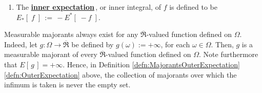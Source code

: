 \begin{definition}
\begin{enumerate}
\begin{equation*}
\begin{array}{c}
				\textnormal{$g:\Omega\rightarrow\overline{\Re}$ is a measurable majorant of $f$, and}
				\\
				\textnormal{$E\!\left[\,g\,\right] \in \overline{\Re}$ is defined ($g$ need not be $\mu$-integrable)}
			\end{array}
			\right.
			\right\}
	\end{equation*}
\item
	The \underline{\textbf{inner expectation}}\,, or inner integral,
	of $f$ is defined to be
	$E_{*}\!\left[\;f\;\right] \, := \, - E^{*}\!\left[\;- f\;\right]$.
\end{enumerate}
\end{definition}

\begin{remark}
\mbox{}\vskip 0.1cm
\noindent
Measurable majorants always exist for any $\overline{\Re}$-valued function defined on $\Omega$.
Indeed, let $g : \Omega \longrightarrow \overline{\Re}$ be defined by $g(\omega) := +\infty$, for each $\omega \in \Omega$.
Then, $g$ is a measurable majorant of every $\overline{\Re}$-valued function defined on $\Omega$.
Note furthermore that $E\!\left[\,g\,\right] = +\infty$.
Hence, in Definition \ref{defn:MajorantsOuterExpectation} \eqref{defn:OuterExpectation} above,
the collection of majorants over which the infimum is taken is never the empty set.
\end{remark}

